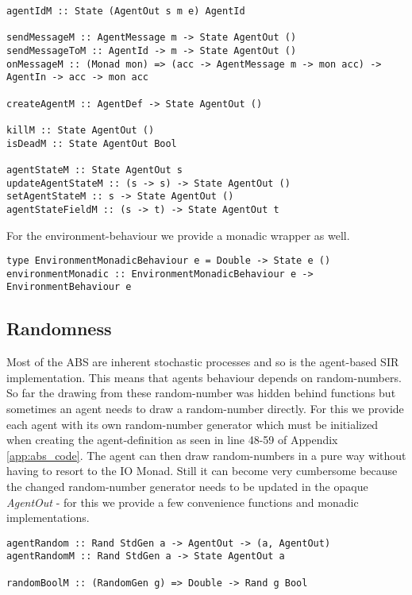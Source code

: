 \begin{verbatim}
agentIdM :: State (AgentOut s m e) AgentId

sendMessageM :: AgentMessage m -> State AgentOut ()
sendMessageToM :: AgentId -> m -> State AgentOut ()
onMessageM :: (Monad mon) => (acc -> AgentMessage m -> mon acc) -> AgentIn -> acc -> mon acc

createAgentM :: AgentDef -> State AgentOut ()

killM :: State AgentOut ()
isDeadM :: State AgentOut Bool

agentStateM :: State AgentOut s
updateAgentStateM :: (s -> s) -> State AgentOut ()
setAgentStateM :: s -> State AgentOut ()
agentStateFieldM :: (s -> t) -> State AgentOut t
\end{verbatim}

For the environment-behaviour we provide a monadic wrapper as well.

\begin{verbatim}
type EnvironmentMonadicBehaviour e = Double -> State e ()
environmentMonadic :: EnvironmentMonadicBehaviour e -> EnvironmentBehaviour e
\end{verbatim}

\subsection{Randomness}
Most of the ABS are inherent stochastic processes and so is the agent-based SIR implementation. This means that agents behaviour depends on random-numbers. So far the drawing from these random-number was hidden behind functions but sometimes an agent needs to draw a random-number directly. For this we provide each agent with its own random-number generator which must be initialized when creating the agent-definition as seen in line 48-59 of Appendix \ref{app:abs_code}. The agent can then draw random-numbers in a pure way without having to resort to the IO Monad. Still it can become very cumbersome because the changed random-number generator needs to be updated in the opaque \textit{AgentOut} - for this we provide a few convenience functions and monadic implementations.

\begin{verbatim}
agentRandom :: Rand StdGen a -> AgentOut -> (a, AgentOut)
agentRandomM :: Rand StdGen a -> State AgentOut a

randomBoolM :: (RandomGen g) => Double -> Rand g Bool
\end{verbatim}

